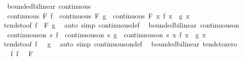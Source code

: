 \begin{isabellebody}
\endisatagproof
{\isafoldproof}%
%
\isadelimproof
\isanewline
%
\endisadelimproof
\isanewline
{}\isamarkupfalse%
\ {\isacharparenleft}{\kern0pt}\ bounded{\isacharunderscore}{\kern0pt}bilinear{\isacharparenright}{\kern0pt}\ continuous{\isacharcolon}{\kern0pt}\isanewline
\ \ {\isachardoublequoteopen}continuous\ F\ f\ {\isasymLongrightarrow}\ continuous\ F\ g\ {\isasymLongrightarrow}\ continuous\ F\ {\isacharparenleft}{\kern0pt}{\isasymlambda}x{\isachardot}{\kern0pt}\ f\ x\ {\isacharasterisk}{\kern0pt}{\isacharasterisk}{\kern0pt}\ g\ x{\isacharparenright}{\kern0pt}{\isachardoublequoteclose}\isanewline
%
\isadelimproof
\ \ %
\endisadelimproof
%
\isatagproof
{}\isamarkupfalse%
\ tendsto{\isacharbrackleft}{\kern0pt}of\ f\ {\isacharunderscore}{\kern0pt}\ F\ g{\isacharbrackright}{\kern0pt}\ \isamarkupfalse%
\ {\isacharparenleft}{\kern0pt}auto\ simp{\isacharcolon}{\kern0pt}\ continuous{\isacharunderscore}{\kern0pt}def{\isacharparenright}{\kern0pt}%
\endisatagproof
{\isafoldproof}%
%
\isadelimproof
\isanewline
%
\endisadelimproof
\isanewline
{}\isamarkupfalse%
\ {\isacharparenleft}{\kern0pt}\ bounded{\isacharunderscore}{\kern0pt}bilinear{\isacharparenright}{\kern0pt}\ continuous{\isacharunderscore}{\kern0pt}on{\isacharcolon}{\kern0pt}\isanewline
\ \ {\isachardoublequoteopen}continuous{\isacharunderscore}{\kern0pt}on\ s\ f\ {\isasymLongrightarrow}\ continuous{\isacharunderscore}{\kern0pt}on\ s\ g\ {\isasymLongrightarrow}\ continuous{\isacharunderscore}{\kern0pt}on\ s\ {\isacharparenleft}{\kern0pt}{\isasymlambda}x{\isachardot}{\kern0pt}\ f\ x\ {\isacharasterisk}{\kern0pt}{\isacharasterisk}{\kern0pt}\ g\ x{\isacharparenright}{\kern0pt}{\isachardoublequoteclose}\isanewline
%
\isadelimproof
\ \ %
\endisadelimproof
%
\isatagproof
{}\isamarkupfalse%
\ tendsto{\isacharbrackleft}{\kern0pt}of\ f\ {\isacharunderscore}{\kern0pt}\ {\isacharunderscore}{\kern0pt}\ g{\isacharbrackright}{\kern0pt}\ \isamarkupfalse%
\ {\isacharparenleft}{\kern0pt}auto\ simp{\isacharcolon}{\kern0pt}\ continuous{\isacharunderscore}{\kern0pt}on{\isacharunderscore}{\kern0pt}def{\isacharparenright}{\kern0pt}%
\endisatagproof
{\isafoldproof}%
%
\isadelimproof
\isanewline
%
\endisadelimproof
\isanewline
{}\isamarkupfalse%
\ {\isacharparenleft}{\kern0pt}\ bounded{\isacharunderscore}{\kern0pt}bilinear{\isacharparenright}{\kern0pt}\ tendsto{\isacharunderscore}{\kern0pt}zero{\isacharcolon}{\kern0pt}\isanewline
\ \ \ f{\isacharcolon}{\kern0pt}\ {\isachardoublequoteopen}{\isacharparenleft}{\kern0pt}f\ {\isasymlonglongrightarrow}\ {}{\isacharparenright}{\kern0pt}\ F{\isachardoublequoteclose}\isanewline

\end{isabellebody}

